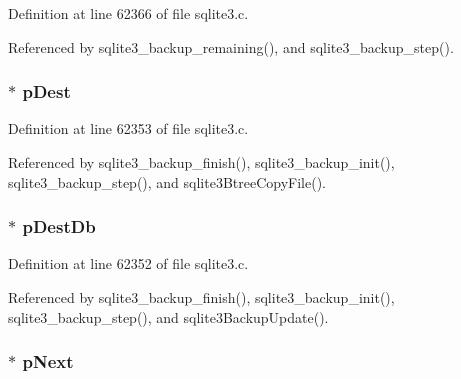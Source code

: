 Definition at line 62366 of file sqlite3.\+c.



Referenced by sqlite3\+\_\+backup\+\_\+remaining(), and sqlite3\+\_\+backup\+\_\+step().

\hypertarget{structsqlite3__backup_a845b397227de5c11118fa9db6b80ebde}{}
\subsubsection[{p\+Dest}]{$\ast$ p\+Dest}\label{structsqlite3__backup_a845b397227de5c11118fa9db6b80ebde}


Definition at line 62353 of file sqlite3.\+c.



Referenced by sqlite3\+\_\+backup\+\_\+finish(), sqlite3\+\_\+backup\+\_\+init(), sqlite3\+\_\+backup\+\_\+step(), and sqlite3\+Btree\+Copy\+File().

\hypertarget{structsqlite3__backup_a4fe8f1d9456d5a379a3b1f6ffd50fbe0}{}
\subsubsection[{p\+Dest\+Db}]{$\ast$ p\+Dest\+Db}\label{structsqlite3__backup_a4fe8f1d9456d5a379a3b1f6ffd50fbe0}


Definition at line 62352 of file sqlite3.\+c.



Referenced by sqlite3\+\_\+backup\+\_\+finish(), sqlite3\+\_\+backup\+\_\+init(), sqlite3\+\_\+backup\+\_\+step(), and sqlite3\+Backup\+Update().

\hypertarget{structsqlite3__backup_a76f1349753f0e489a86cacd7afe3aa3a}{}
\subsubsection[{p\+Next}]{$\ast$ p\+Next}\label{structsqlite3__backup_a76f1349753f0e489a86cacd7afe3aa3a}


